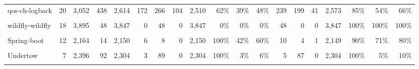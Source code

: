 \begin{table*}[t]
\begin{tabular}{l|rrrr|rrrrrrr|rrrrrrr}
qos-ch-logback&20&3,052&438&2,614&172&266&104&2,510&62\%&39\%&48\%&239&199&41&2,573&85\%&54\%&66\%\\
\cellcolor{gray!6}{Http-request}&\cellcolor{gray!6}{18}&\cellcolor{gray!6}{3,888}&\cellcolor{gray!6}{3,501}&\cellcolor{gray!6}{387}&\cellcolor{gray!6}{3,498}&\cellcolor{gray!6}{3}&\cellcolor{gray!6}{124}&\cellcolor{gray!6}{263}&\cellcolor{gray!6}{96\%}&\cellcolor{gray!6}{99\%}&\cellcolor{gray!6}{98\%}&\cellcolor{gray!6}{3,498}&\cellcolor{gray!6}{3}&\cellcolor{gray!6}{54}&\cellcolor{gray!6}{333}&\cellcolor{gray!6}{98\%}&\cellcolor{gray!6}{99\%}&\cellcolor{gray!6}{99\%}\\
wildfly-wildfly&18&3,895&48&3,847&0&48&0&3,847&0\%&0\%&0\%&48&0&0&3,847&100\%&100\%&100\%\\
\cellcolor{gray!6}{wro4j-wro4j}&\cellcolor{gray!6}{14}&\cellcolor{gray!6}{11,373}&\cellcolor{gray!6}{10,833}&\cellcolor{gray!6}{540}&\cellcolor{gray!6}{10,833}&\cellcolor{gray!6}{0}&\cellcolor{gray!6}{65}&\cellcolor{gray!6}{475}&\cellcolor{gray!6}{99\%}&\cellcolor{gray!6}{100\%}&\cellcolor{gray!6}{99\%}&\cellcolor{gray!6}{10,833}&\cellcolor{gray!6}{0}&\cellcolor{gray!6}{29}&\cellcolor{gray!6}{511}&\cellcolor{gray!6}{99\%}&\cellcolor{gray!6}{100\%}&\cellcolor{gray!6}{99\%}\\
Spring-boot&12&2,164&14&2,150&6&8&0&2,150&100\%&42\%&60\%&10&4&1&2,149&90\%&71\%&80\%\\
\cellcolor{gray!6}{orbit-orbit}&\cellcolor{gray!6}{7}&\cellcolor{gray!6}{3,765}&\cellcolor{gray!6}{2,943}&\cellcolor{gray!6}{822}&\cellcolor{gray!6}{2,943}&\cellcolor{gray!6}{0}&\cellcolor{gray!6}{69}&\cellcolor{gray!6}{753}&\cellcolor{gray!6}{97\%}&\cellcolor{gray!6}{100\%}&\cellcolor{gray!6}{98\%}&\cellcolor{gray!6}{2,943}&\cellcolor{gray!6}{0}&\cellcolor{gray!6}{59}&\cellcolor{gray!6}{763}&\cellcolor{gray!6}{98\%}&\cellcolor{gray!6}{100\%}&\cellcolor{gray!6}{99\%}\\
Undertow&7&2,396&92&2,304&3&89&0&2,304&100\%&3\%&6\%&5&87&0&2,304&100\%&5\%&10\%\\
\cellcolor{gray!6}{Achilles}&\cellcolor{gray!6}{4}&\cellcolor{gray!6}{607}&\cellcolor{gray!6}{165}&\cellcolor{gray!6}{442}&\cellcolor{gray!6}{120}&\cellcolor{gray!6}{45}&\cellcolor{gray!6}{0}&\cellcolor{gray!6}{442}&\cellcolor{gray!6}{100\%}&\cellcolor{gray!6}{72\%}&\cellcolor{gray!6}{84\%}&\cellcolor{gray!6}{148}&\cellcolor{gray!6}{17}&\cellcolor{gray!6}{26}&\cellcolor{gray!6}{416}&\cellcolor{gray!6}{85\%}&\cellcolor{gray!6}{89\%}&\cellcolor{gray!6}{87\%}\\

\end{tabular}
\end{table*}
